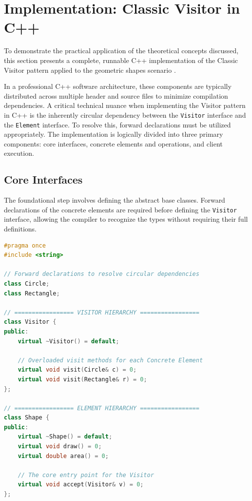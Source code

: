 \section{Implementation: Classic Visitor in C++}
\label{sec:implementation}

To demonstrate the practical application of the theoretical concepts discussed, this section presents a complete, runnable C++ implementation of the Classic Visitor pattern applied to the geometric shapes scenario \cite{gof1994}.

In a professional C++ software architecture, these components are typically distributed across multiple header and source files to minimize compilation dependencies. A critical technical nuance when implementing the Visitor pattern in C++ is the inherently circular dependency between the \texttt{Visitor} interface and the \texttt{Element} interface. To resolve this, forward declarations must be utilized appropriately. The implementation is logically divided into three primary components: core interfaces, concrete elements and operations, and client execution.

\subsection{Core Interfaces}
The foundational step involves defining the abstract base classes. Forward declarations of the concrete elements are required before defining the \texttt{Visitor} interface, allowing the compiler to recognize the types without requiring their full definitions.

\begin{lstlisting}[language=C++, caption=Core Interfaces (typically \texttt{Visitor.h} and \texttt{Shape.h})]
#pragma once
#include <string>

// Forward declarations to resolve circular dependencies
class Circle;
class Rectangle;

// ================= VISITOR HIERARCHY =================
class Visitor {
public:
    virtual ~Visitor() = default;
    
    // Overloaded visit methods for each Concrete Element
    virtual void visit(Circle& c) = 0;
    virtual void visit(Rectangle& r) = 0;
};

// ================= ELEMENT HIERARCHY =================
class Shape {
public:
    virtual ~Shape() = default;
    virtual void draw() = 0;
    virtual double area() = 0;
    
    // The core entry point for the Visitor
    virtual void accept(Visitor& v) = 0;
};
\end{lstlisting}

